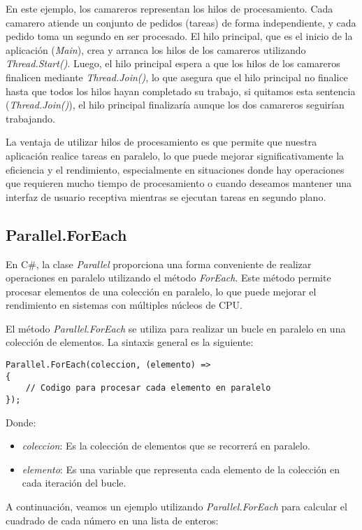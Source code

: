 \documentclass[executivepaper]{article}
\begin{document}
En este ejemplo, los camareros representan los hilos de procesamiento. Cada camarero atiende un conjunto de pedidos (tareas) de forma independiente, y cada pedido toma un segundo en ser procesado. El hilo principal, que es el inicio de la aplicación (\emph{Main}), crea y arranca los hilos de los camareros utilizando \emph{Thread.Start()}. Luego, el hilo principal espera a que los hilos de los camareros finalicen mediante \emph{Thread.Join()}, lo que asegura que el hilo principal no finalice hasta que todos los hilos hayan completado su trabajo, si quitamos esta sentencia (\emph{Thread.Join()}), el hilo principal finalizaría aunque los dos camareros seguirían trabajando.

La ventaja de utilizar hilos de procesamiento es que permite que nuestra aplicación realice tareas en paralelo, lo que puede mejorar significativamente la eficiencia y el rendimiento, especialmente en situaciones donde hay operaciones que requieren mucho tiempo de procesamiento o cuando deseamos mantener una interfaz de usuario receptiva mientras se ejecutan tareas en segundo plano.

\subsection{Parallel.ForEach}

En C\#, la clase \emph{Parallel} proporciona una forma conveniente de realizar operaciones en paralelo utilizando el método \emph{ForEach}. Este método permite procesar elementos de una colección en paralelo, lo que puede mejorar el rendimiento en sistemas con múltiples núcleos de CPU.

El método \emph{Parallel.ForEach} se utiliza para realizar un bucle en paralelo en una colección de elementos. La sintaxis general es la siguiente:

\begin{lstlisting}
Parallel.ForEach(coleccion, (elemento) =>
{
    // Codigo para procesar cada elemento en paralelo
});
\end{lstlisting}

Donde:
\begin{itemize}
    \item \emph{coleccion}: Es la colección de elementos que se recorrerá en paralelo.
    \item \emph{elemento}: Es una variable que representa cada elemento de la colección en cada iteración del bucle.
\end{itemize}

A continuación, veamos un ejemplo utilizando \emph{Parallel.ForEach} para calcular el cuadrado de cada número en una lista de enteros:
\end{document}
